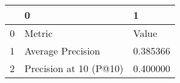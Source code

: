 \begin{tabular}{lll}
\toprule
 & 0 & 1 \\
\midrule
0 & Metric & Value \\
1 & Average Precision & 0.385366 \\
2 & Precision at 10 (P@10) & 0.400000 \\
\bottomrule
\end{tabular}
